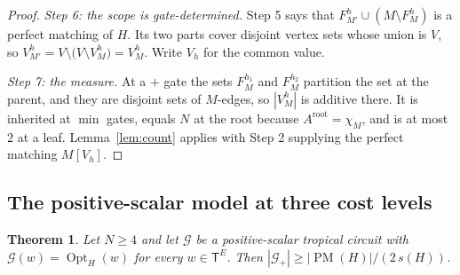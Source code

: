 \documentclass[11pt]{article}
\newtheorem{theorem}{Theorem}[section]
\newcommand{\Opt}{\operatorname{Opt}}
\newcommand{\PM}{\operatorname{PM}}
\begin{document}
\begin{proof}
\emph{Step 6: the scope is gate-determined.}
Step 5 says that $F^h_{M'}\cup(M\setminus F^h_M)$ is a perfect matching of $H$.
Its two parts cover disjoint vertex sets whose union is $V$, so
$V^h_{M'}=V\setminus\bigl(V\setminus V^h_M\bigr)=V^h_M$.  Write $V_h$ for the
common value.

\emph{Step 7: the measure.}
At a $+$ gate the sets $F^{h_1}_M$ and $F^{h_2}_M$ partition the set at the
parent, and they are disjoint sets of $M$-edges, so $|V^h_M|$ is additive there.
It is inherited at $\min$ gates, equals $N$ at the root because
$A^{\mathrm{root}}=\chi_M$, and is at most $2$ at a leaf.
Lemma~\ref{lem:count} applies with Step 2 supplying the perfect matching
$M[V_h]$.
\end{proof}

\subsection{The positive-scalar model at three cost levels}

\begin{theorem}
\label{thm:scalar-full}
Let $N\ge4$ and let $\mathcal G$ be a positive-scalar tropical circuit with
$\mathcal G(w)=\Opt_H(w)$ for every $w\in\mathsf T^{E}$.  Then
$|\mathcal G_+|\ge|\PM(H)|/(2\,s(H))$.
\end{theorem}
\end{document}
